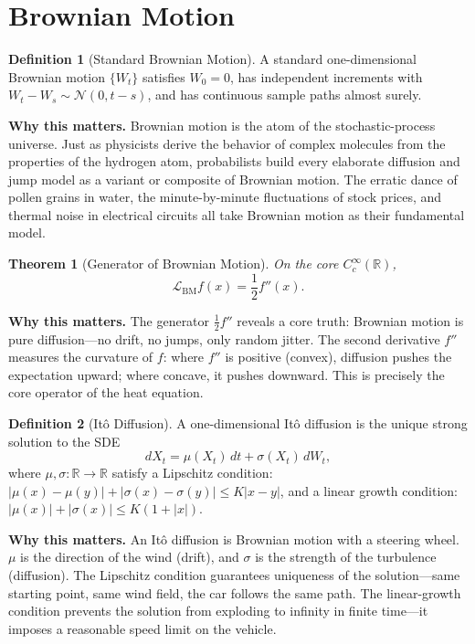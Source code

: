 \documentclass[11pt,a4paper,openany]{book}
\theoremstyle{definition}
\newtheorem{definition}{Definition}[chapter]
\theoremstyle{plain}
\newtheorem{theorem}{Theorem}[chapter]
\theoremstyle{remark}
\newcommand{\1}{\mathbbm{1}}
\newcommand{\R}{\mathbb{R}}
\newcommand{\calL}{\mathcal{L}}
\begin{document}
\section{Brownian Motion}

\begin{definition}[Standard Brownian Motion]
A standard one-dimensional Brownian motion $\{W_{t}\}$ satisfies $W_{0} = 0$, has independent increments with $W_{t} - W_{s} \sim \mathcal{N}(0, t-s)$, and has continuous sample paths almost surely.
\end{definition}

\medskip
\noindent\textbf{Why this matters.} Brownian motion is the atom of the stochastic-process universe. Just as physicists derive the behavior of complex molecules from the properties of the hydrogen atom, probabilists build every elaborate diffusion and jump model as a variant or composite of Brownian motion. The erratic dance of pollen grains in water, the minute-by-minute fluctuations of stock prices, and thermal noise in electrical circuits all take Brownian motion as their fundamental model.

\begin{theorem}[Generator of Brownian Motion]
On the core $C_{c}^{\infty}(\R)$,
\[
\calL_{\text{BM}} f(x) = \frac{1}{2} f''(x).
\]
\end{theorem}

\medskip
\noindent\textbf{Why this matters.} The generator $\frac{1}{2}f''$ reveals a core truth: Brownian motion is pure diffusion---no drift, no jumps, only random jitter. The second derivative $f''$ measures the curvature of $f$: where $f''$ is positive (convex), diffusion pushes the expectation upward; where concave, it pushes downward. This is precisely the core operator of the heat equation.

\begin{definition}[It\^{o} Diffusion]
A one-dimensional It\^{o} diffusion is the unique strong solution to the SDE
\[
dX_{t} = \mu(X_{t}) \, dt + \sigma(X_{t}) \, dW_{t},
\]
where $\mu, \sigma: \R \to \R$ satisfy a Lipschitz condition: $|\mu(x) - \mu(y)| + |\sigma(x) - \sigma(y)| \leq K|x-y|$, and a linear growth condition: $|\mu(x)| + |\sigma(x)| \leq K(1 + |x|)$.
\end{definition}

\medskip
\noindent\textbf{Why this matters.} An It\^{o} diffusion is Brownian motion with a steering wheel. $\mu$ is the direction of the wind (drift), and $\sigma$ is the strength of the turbulence (diffusion). The Lipschitz condition guarantees uniqueness of the solution---same starting point, same wind field, the car follows the same path. The linear-growth condition prevents the solution from exploding to infinity in finite time---it imposes a reasonable speed limit on the vehicle.
\end{document}
